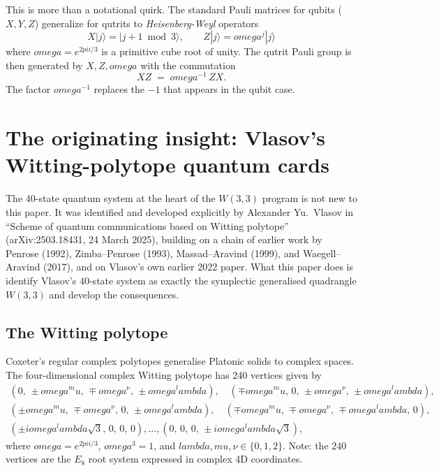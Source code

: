 \documentclass[11pt]{article}
\def\textbf#1{#1}%
\def\omega{omega}%
\def\lambda{lambda}%
\def\mu{mu}%
\def\pi{pi}%
\begin{document}
This is more than a notational quirk. The standard Pauli matrices for qubits ($X, Y, Z$) generalize for qutrits to \emph{Heisenberg-Weyl} operators
\[
X|j\rangle = |j+1 \bmod 3\rangle, \qquad
Z|j\rangle = \omega^j |j\rangle
\]
where $\omega = e^{2\pi i / 3}$ is a primitive cube root of unity. The qutrit Pauli group is then generated by $X, Z, \omega$ with the commutation
\[
X Z \;=\; \omega^{-1}\, Z X.
\]
The factor $\omega^{-1}$ replaces the $-1$ that appears in the qubit case.

\section{The originating insight: Vlasov's Witting-polytope quantum cards}

\label{sec:vlasov-witting}

\begin{history}
The 40-state quantum system at the heart of the $W(3,3)$ program is not new to this paper. It was identified and developed explicitly by \textbf{Alexander Yu.\ Vlasov} in ``Scheme of quantum communications based on Witting polytope'' (arXiv:2503.18431, 24 March 2025), building on a chain of earlier work by Penrose (1992), Zimba--Penrose (1993), Massad--Aravind (1999), and Waegell--Aravind (2017), and on Vlasov's own earlier 2022 paper. What this paper does is identify Vlasov's $40$-state system as exactly the symplectic generalised quadrangle $W(3,3)$ and develop the consequences.
\end{history}

\subsection*{The Witting polytope}

Coxeter's regular complex polytopes generalise Platonic solids to complex spaces. The four-dimensional complex \textbf{Witting polytope} has \textbf{240 vertices} given by
\[
\begin{array}{l}
(0,\,\pm\omega^\mu,\,\mp\omega^\nu,\,\pm\omega^\lambda), \quad (\mp\omega^\mu,\,0,\,\pm\omega^\nu,\,\pm\omega^\lambda), \\[0.4em]
(\pm\omega^\mu,\,\mp\omega^\nu,\,0,\,\pm\omega^\lambda), \quad (\mp\omega^\mu,\,\mp\omega^\nu,\,\mp\omega^\lambda,\,0), \\[0.4em]
(\pm i \omega^\lambda\sqrt{3},\,0,\,0,\,0),\ldots,(0,\,0,\,0,\,\pm i\omega^\lambda\sqrt{3}),
\end{array}
\]
where $\omega = e^{2\pi i/3}$, $\omega^3 = 1$, and $\lambda,\mu,\nu \in \{0, 1, 2\}$. Note: \textbf{the $240$ vertices are the $E_8$ root system} expressed in complex 4D coordinates.
\end{document}
